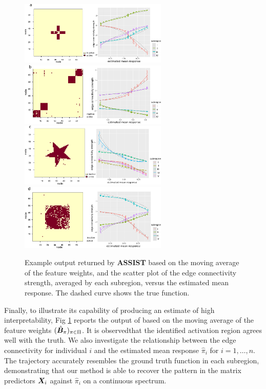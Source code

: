 \documentclass[aos]{imsart}
\theoremstyle{definition}
\def\NonparaM{\text{\bf \footnotesize ASSIST }}
\begin{document}
\begin{figure}[t!]
\centering
\includegraphics[width=7.05cm]{figure/est_cross.pdf} 
\includegraphics[width=7.05cm]{figure/est_block.pdf}
\includegraphics[width=7.05cm]{figure/est_star.pdf}
\includegraphics[width=7.05cm]{figure/est_circle.pdf}
\caption{Example output returned by {\bf \scriptsize ASSIST} based on the moving average of the feature weights, and the scatter plot of the edge connectivity strength, averaged by each subregion, versus the estimated mean response. The dashed curve shows the true function. }
\label{fig:compare2}
\end{figure}

Finally, to illustrate its capability of producing an estimate of high interpretability, Fig \ref{fig:compare2} reports the output of \NonparaM based on the moving average of the feature weights $(\hat {\bm B}_\pi)_{\pi\in\Pi}$. It is observedthat the identified activation region agrees well with the truth. We also investigate the relationship between the edge connectivity for individual $i$ and the estimated mean response $\hat \pi_i$ for $i=1,\ldots,n$. The trajectory accurately resembles the ground truth function in each subregion, demonstrating that our method is able to recover the pattern in the matrix predictors $\bm X_i$ against $\hat \pi_i$ on a continuous spectrum.
\end{document}
